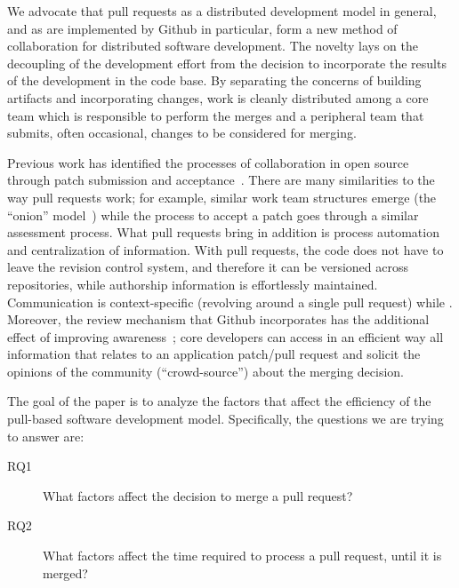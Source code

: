 \documentclass{sig-alternate}
\begin{document}
We advocate that pull requests as a distributed development model in general,
and as are implemented by Github in particular, form a new method of
collaboration for distributed software development. The novelty lays on
the decoupling of the development effort from the decision to incorporate
the results of the development in the code base. 
By separating the concerns of building artifacts and incorporating
changes, work is cleanly distributed among a core team which is responsible
to perform the merges and a peripheral team that submits, often occasional,
changes to be considered for merging.

Previous work has identified the processes of collaboration in open source
through patch submission and acceptance~\cite{MOCKU02, Bird07, Weiss08}.  There
are many similarities to the way pull requests work; for example, similar work
team structures emerge (the ``onion'' model~\cite{Crow05}) while the process to
accept a patch goes through a similar assessment process.  What pull requests
bring in addition is process automation and centralization of information.
With pull requests, the code does not have to leave the revision control
system, and therefore it can be versioned across repositories, while authorship
information is effortlessly maintained. Communication is context-specific
(revolving around a single pull request) while .  Moreover, the review
mechanism that Github incorporates has the additional effect of improving
awareness~\cite{Dabbi12}; core developers can access in an efficient way all
information that relates to an application patch/pull request and solicit the
opinions of the community (``crowd-source'') about the merging decision.

The goal of the paper is to analyze the factors that affect the efficiency
of the pull-based software development model. Specifically, the questions we are trying to answer are: 

\begin{description}

  \item[RQ1] What factors affect the decision to merge a pull request?

  \item[RQ2] What factors affect the time required to process a pull request,
    until it is merged?

\end{description}
\end{document}

